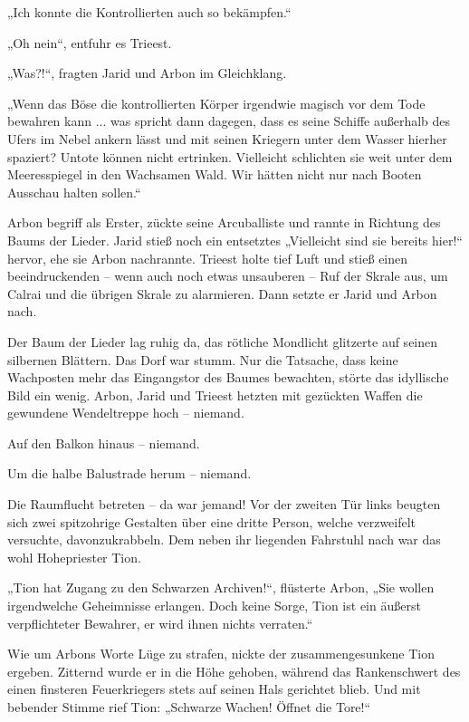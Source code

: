 „Ich konnte die Kontrollierten auch so bekämpfen.“

„Oh nein“, entfuhr es Trieest.

„Was?!“, fragten Jarid und Arbon im Gleichklang.

„Wenn das Böse die kontrollierten Körper irgendwie magisch vor dem Tode bewahren kann ... was spricht dann dagegen, dass es seine Schiffe außerhalb des Ufers im Nebel ankern lässt und mit seinen Kriegern unter dem Wasser hierher spaziert? Untote können nicht ertrinken. Vielleicht schlichten sie weit unter dem Meeresspiegel in den Wachsamen Wald. Wir hätten nicht nur nach Booten Ausschau halten sollen.“

Arbon begriff als Erster, zückte seine Arcuballiste und rannte in Richtung des Baums der Lieder. Jarid stieß noch ein entsetztes „Vielleicht sind sie bereits hier!“ hervor, ehe sie Arbon nachrannte. Trieest holte tief Luft und stieß einen beeindruckenden – wenn auch noch etwas unsauberen – Ruf der Skrale aus, um Calrai und die übrigen Skrale zu alarmieren. Dann setzte er Jarid und Arbon nach.



\trennzeichen



Der Baum der Lieder lag ruhig da, das rötliche Mondlicht glitzerte auf seinen silbernen Blättern. Das Dorf war stumm. Nur die Tatsache, dass keine Wachposten mehr das Eingangstor des Baumes bewachten, störte das idyllische Bild ein wenig. Arbon, Jarid und Trieest hetzten mit gezückten Waffen die gewundene Wendeltreppe hoch – niemand.

Auf den Balkon hinaus – niemand.

Um die halbe Balustrade herum – niemand.

Die Raumflucht betreten – da war jemand! Vor der zweiten Tür links beugten sich zwei spitzohrige Gestalten über eine dritte Person, welche verzweifelt versuchte, davonzukrabbeln. Dem neben ihr liegenden Fahrstuhl nach war das wohl Hohepriester Tion.

„Tion hat Zugang zu den Schwarzen Archiven!“, flüsterte Arbon, „Sie wollen irgendwelche Geheimnisse erlangen. Doch keine Sorge, Tion ist ein äußerst verpflichteter Bewahrer, er wird ihnen nichts verraten.“

Wie um Arbons Worte Lüge zu strafen, nickte der zusammengesunkene Tion ergeben. Zitternd wurde er in die Höhe gehoben, während das Rankenschwert des einen finsteren Feuerkriegers stets auf seinen Hals gerichtet blieb. Und mit bebender Stimme rief Tion: „Schwarze Wachen! Öffnet die Tore!“

